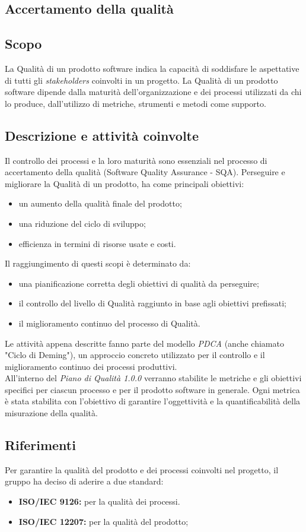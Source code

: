 \subsection{Accertamento della qualit\` a}
\subsection{Scopo}
La Qualità di un prodotto software indica la capacità di soddisfare le aspettative di tutti gli \textit{stakeholders\glo} coinvolti in un progetto.
La Qualità di un prodotto software dipende dalla maturità dell'organizzazione e dei processi utilizzati da chi lo produce, dall'utilizzo di metriche, strumenti e metodi come supporto.


\subsection{Descrizione e attività coinvolte}
Il controllo dei processi e la loro maturità sono essenziali nel processo di accertamento della qualità (Software Quality Assurance - SQA). 
Perseguire e migliorare la Qualità di un prodotto, ha come principali obiettivi:
\begin{itemize}
	\item un aumento della qualità finale del prodotto;
	\item una riduzione del ciclo di sviluppo;
	\item efficienza in termini di risorse usate e costi.
\end{itemize}
Il raggiungimento di questi scopi è determinato da:
\begin{itemize}
	\item una pianificazione corretta degli obiettivi di qualità da perseguire;
	\item il controllo del livello di Qualità raggiunto in base agli obiettivi prefissati;
	\item il miglioramento continuo del processo di Qualità.
\end{itemize}
Le attività appena descritte fanno parte del modello \textit{PDCA\glo} (anche chiamato "Ciclo di Deming"), un approccio concreto utilizzato per il controllo e il miglioramento continuo dei processi produttivi.\\
All'interno del \textit{Piano di Qualità 1.0.0\doc} verranno stabilite le metriche e gli obiettivi specifici per ciascun processo e per il prodotto software in generale. Ogni metrica è stata stabilita con l'obiettivo di garantire l'oggettività e la quantificabilità della misurazione della qualità.

\subsection{Riferimenti}
Per garantire la qualità del prodotto e dei processi coinvolti nel progetto, il gruppo ha deciso di aderire a due standard:
\begin{itemize}
	\item \textbf{ISO/IEC 9126:} per la qualità dei processi.
	\item \textbf{ISO/IEC 12207:} per la qualità del prodotto;
\end{itemize}
